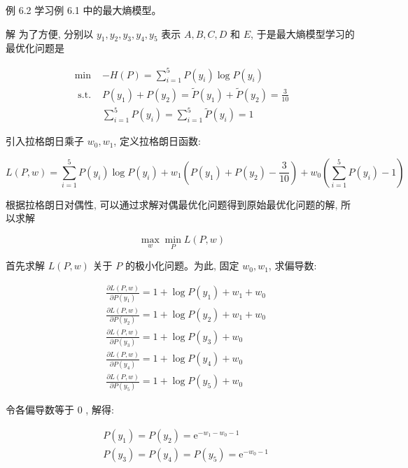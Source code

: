 \documentclass[10pt]{article}
\begin{document}
\begin{CJK*}{UTF8}{bsmi}
例 6.2 学习例 6.1 中的最大熵模型。

解 为了方便, 分别以 $y_{1}, y_{2}, y_{3}, y_{4}, y_{5}$ 表示 $A, B, C, D$ 和 $E$, 于是最大熵模型学习的最优化问题是

$$
\begin{array}{ll}
\min & -H(P)=\sum_{i=1}^{5} P\left(y_{i}\right) \log P\left(y_{i}\right) \\
\text { s.t. } & P\left(y_{1}\right)+P\left(y_{2}\right)=\tilde{P}\left(y_{1}\right)+\tilde{P}\left(y_{2}\right)=\frac{3}{10} \\
& \sum_{i=1}^{5} P\left(y_{i}\right)=\sum_{i=1}^{5} \tilde{P}\left(y_{i}\right)=1
\end{array}
$$

引入拉格朗日乘子 $w_{0}, w_{1}$, 定义拉格朗日函数:

$$
L(P, w)=\sum_{i=1}^{5} P\left(y_{i}\right) \log P\left(y_{i}\right)+w_{1}\left(P\left(y_{1}\right)+P\left(y_{2}\right)-\frac{3}{10}\right)+w_{0}\left(\sum_{i=1}^{5} P\left(y_{i}\right)-1\right)
$$

根据拉格朗日对偶性, 可以通过求解对偶最优化问题得到原始最优化问题的解, 所以求解

$$
\max _{w} \min _{P} L(P, w)
$$

首先求解 $L(P, w)$ 关于 $P$ 的极小化问题。为此, 固定 $w_{0}, w_{1}$, 求偏导数:

$$
\begin{aligned}
& \frac{\partial L(P, w)}{\partial P\left(y_{1}\right)}=1+\log P\left(y_{1}\right)+w_{1}+w_{0} \\
& \frac{\partial L(P, w)}{\partial P\left(y_{2}\right)}=1+\log P\left(y_{2}\right)+w_{1}+w_{0} \\
& \frac{\partial L(P, w)}{\partial P\left(y_{3}\right)}=1+\log P\left(y_{3}\right)+w_{0} \\
& \frac{\partial L(P, w)}{\partial P\left(y_{4}\right)}=1+\log P\left(y_{4}\right)+w_{0} \\
& \frac{\partial L(P, w)}{\partial P\left(y_{5}\right)}=1+\log P\left(y_{5}\right)+w_{0}
\end{aligned}
$$

令各偏导数等于 0 , 解得:

$$
\begin{aligned}
& P\left(y_{1}\right)=P\left(y_{2}\right)=\mathrm{e}^{-w_{1}-w_{0}-1} \\
& P\left(y_{3}\right)=P\left(y_{4}\right)=P\left(y_{5}\right)=\mathrm{e}^{-w_{0}-1}
\end{aligned}
$$


\end{CJK*}
\end{document}
